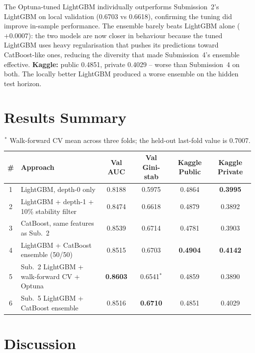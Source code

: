 \documentclass[11pt]{article}
\begin{document}
The Optuna-tuned LightGBM individually outperforms Submission~2's LightGBM on local validation (0.6703 vs 0.6618), confirming the tuning did improve in-sample performance. The ensemble barely beats LightGBM alone ($+0.0007$): the two models are now closer in behaviour because the tuned LightGBM uses heavy regularisation that pushes its predictions toward CatBoost-like ones, reducing the diversity that made Submission~4's ensemble effective. \textbf{Kaggle:} public 0.4851, private 0.4029 -- worse than Submission~4 on both. The locally better LightGBM produced a worse ensemble on the hidden test horizon.

\section{Results Summary}

\begin{table}[H]
\centering
\caption{Comparison of all six submissions. Best per column in bold.}
\label{tab:summary}
\begin{tabular}{clcccc}
\toprule
\# & Approach & Val AUC & Val Gini-stab & Kaggle Public & Kaggle Private \\
\midrule
1 & LightGBM, depth-0 only                           & 0.8188 & 0.5975 & 0.4864 & \textbf{0.3995} \\
2 & LightGBM + depth-1 + 10\% stability filter       & 0.8474 & 0.6618 & 0.4879 & 0.3892 \\
3 & CatBoost, same features as Sub.~2                & 0.8539 & 0.6714 & 0.4781 & 0.3903 \\
4 & LightGBM + CatBoost ensemble (50/50)             & 0.8515 & 0.6703 & \textbf{0.4904} & \textbf{0.4142} \\
5 & Sub.~2 LightGBM + walk-forward CV + Optuna       & \textbf{0.8603} & 0.6541$^*$ & 0.4859 & 0.3890 \\
6 & Sub.~5 LightGBM + CatBoost ensemble              & 0.8516 & \textbf{0.6710} & 0.4851 & 0.4029 \\
\bottomrule
\end{tabular}
\caption*{\footnotesize $^*$ Walk-forward CV mean across three folds; the held-out last-fold value is 0.7007.}
\end{table}

\section{Discussion}
\end{document}
